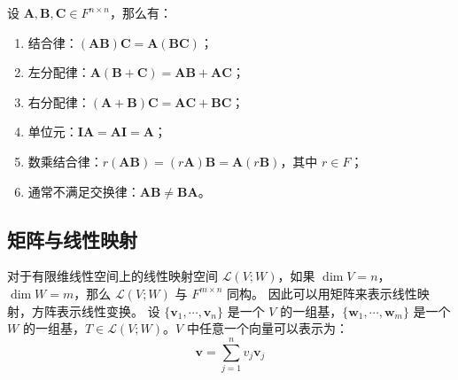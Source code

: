 \begin{proposition}[方阵乘法的性质]
    设 $\mathbf{A},\mathbf{B},\mathbf{C}\in F^{n \times n}$，那么有：
    \begin{enumerate}
        \item 结合律：$(\mathbf{A}\mathbf{B})\mathbf{C} = \mathbf{A}(\mathbf{B}\mathbf{C})$；
        \item 左分配律：$\mathbf{A}(\mathbf{B} + \mathbf{C}) = \mathbf{A}\mathbf{B} + \mathbf{A}\mathbf{C}$；
        \item 右分配律：$(\mathbf{A} + \mathbf{B})\mathbf{C} = \mathbf{A}\mathbf{C} + \mathbf{B}\mathbf{C}$；
        \item 单位元：$\mathbf{I}\mathbf{A} = \mathbf{A}\mathbf{I} = \mathbf{A}$；
        \item 数乘结合律：$r(\mathbf{A}\mathbf{B}) = (r\mathbf{A})\mathbf{B} = \mathbf{A}(r\mathbf{B})$，其中 $r\in F$；
        \item 通常不满足交换律：$\mathbf{A}\mathbf{B} \neq \mathbf{B}\mathbf{A}$。
    \end{enumerate}
\end{proposition}
\vspace{1em}

\subsection{矩阵与线性映射}
对于有限维线性空间上的线性映射空间 $\mathcal{L}(V;W)$，如果 $\dim V = n$，$\dim W = m$，那么 $\mathcal{L}(V;W)$ 与 $F^{m \times n}$ 同构。
因此可以用矩阵来表示线性映射，方阵表示线性变换。
设 $\{\mathbf{v}_1,\cdots,\mathbf{v}_n\}$ 是一个 $V$ 的一组基，$\{\mathbf{w}_1,\cdots,\mathbf{w}_m\}$ 是一个 $W$ 的一组基，$T\in \mathcal{L}(V;W)$。$V$ 中任意一个向量可以表示为：
\[
    \mathbf{v} = \sum_{j=1}^{n} v_j \mathbf{v}_j
\]


